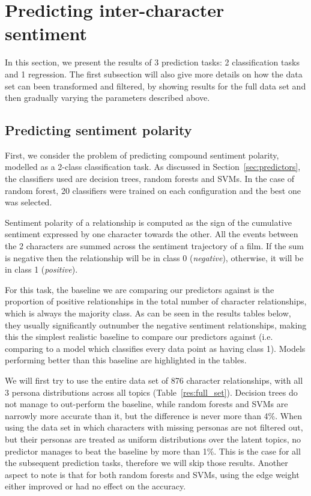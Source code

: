 \documentclass[bsc,frontabs,singlespacing,parskip, twoside]{infthesis}
\begin{document}
\section{Predicting inter-character sentiment}

In this section, we present the results of 3 prediction tasks: 2 classification tasks and 1 regression. The first subsection will also give more details on how the data set can been transformed and filtered, by showing results for the full data set and then gradually varying the parameters described above.

\subsection{Predicting sentiment polarity}
First, we consider the problem of predicting compound sentiment polarity, modelled as a 2-class classification task. As discussed in Section~\ref{sec:predictors}, the classifiers used are decision trees, random forests and SVMs. In the case of random forest, 20 classifiers were trained on each configuration and the best one was selected.

Sentiment polarity of a relationship is computed as the sign of the cumulative sentiment expressed by one character towards the other. All the events between the 2 characters are summed across the sentiment trajectory of a film. If the sum is negative then the relationship will be in class 0 (\textit{negative}), otherwise, it will be in class 1 (\textit{positive}).

For this task, the baseline we are comparing our predictors against is the proportion of positive relationships in the total number of character relationships, which is always the majority class. As can be seen in the results tables below, they usually significantly outnumber the negative sentiment relationships, making this the simplest realistic baseline to compare our predictors against (i.e. comparing to a model which classifies every data point as having class 1). Models performing better than this baseline are highlighted in the tables.

We will first try to use the entire data set of 876 character relationships, with all 3 persona distributions across all topics (Table~\ref{res:full_set}). Decision trees do not manage to out-perform the baseline, while random forests and SVMs are narrowly more accurate than it, but the difference is never more than 4\%. When using the data set in which characters with missing personas are not filtered out, but their personas are treated as uniform distributions over the latent topics, no predictor manages to beat the baseline by more than 1\%. This is the case for all the subsequent prediction tasks, therefore we will skip those results. Another aspect to note is that for both random forests and SVMs, using the edge weight either improved or had no effect on the accuracy.
\end{document}
